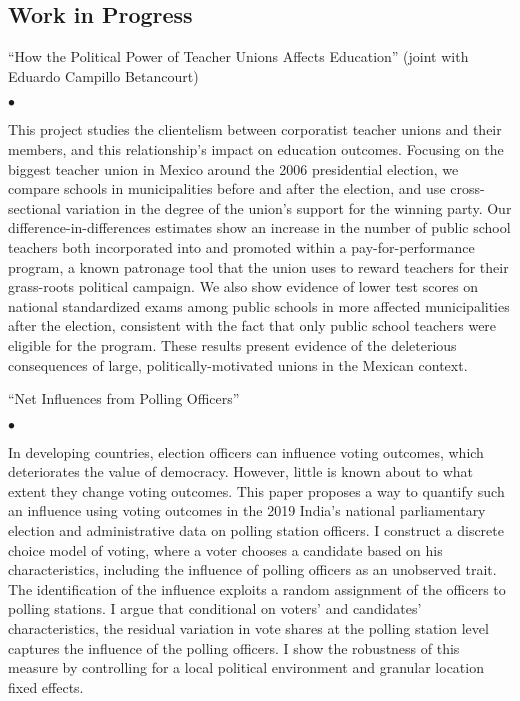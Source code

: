\documentclass[margin,line]{res}
\newenvironment{list1}{
  \begin{list}{\ding{113}}{%
      \setlength{\itemsep}{.025in}
      \setlength{\parsep}{0in} \setlength{\parskip}{0in}
      \setlength{\topsep}{0in} \setlength{\partopsep}{0in}
      \setlength{\leftmargin}{0.17in}}}{\end{list}}
\newenvironment{list2}{
  \begin{list}{$\bullet$}{%
      \setlength{\itemsep}{0in}
      \setlength{\parsep}{0in} \setlength{\parskip}{0in}
      \setlength{\topsep}{0in} \setlength{\partopsep}{0in}
      \setlength{\leftmargin}{0.2in}}}{\end{list}}
\begin{document}
\begin{resume}
\section{Work in Progress}
\begin{list1}
\item[] ``How the Political Power of Teacher Unions Affects Education'' (joint with Eduardo Campillo Betancourt)
\begin{list2}
\item[] This project studies the clientelism between corporatist teacher unions and their members, and this relationship’s impact on education outcomes. Focusing on the biggest teacher union in Mexico around the 2006 presidential election, we compare schools in municipalities before and after the election, and use cross-sectional variation in the degree of the union’s support for the winning party. Our difference-in-differences estimates show an increase in the number of public school teachers both incorporated into and promoted within a pay-for-performance program, a known patronage tool that the union uses to reward teachers for their grass-roots political campaign. We also show evidence of lower test scores on national standardized exams among public schools in more affected municipalities after the election, consistent with the fact that only public school teachers were eligible for the program. These results present evidence of the deleterious consequences of large, politically-motivated unions in the Mexican context. \\
\end{list2}
\item[] ``Net Influences from Polling Officers''
\begin{list2}
\item[] In developing countries, election officers can influence voting outcomes, which deteriorates the value of democracy. However, little is known about to what extent they change voting outcomes. This paper proposes a way to quantify such an influence using voting outcomes in the 2019 India's national parliamentary election and administrative data on polling station officers. I construct a discrete choice model of voting, where a voter chooses a candidate based on his characteristics, including the influence of polling officers as an unobserved trait. The identification of the influence exploits a random assignment of the officers to polling stations. I argue that conditional on voters' and candidates' characteristics, the residual variation in vote shares at the polling station level captures the influence of the polling officers. I show the robustness of this measure by controlling for a local political environment and granular location fixed effects.  
\end{list2}
\end{list1}


\end{resume}
\end{document}
